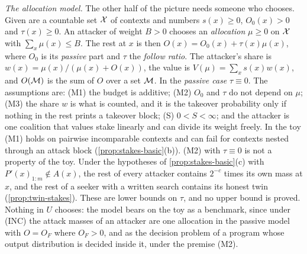 \emph{The allocation model.} The other half of the picture needs someone who chooses. Given are a countable
set $\mathcal X$ of contexts and numbers $s(x)\ge0$, $O_0(x)>0$ and $\tau(x)\ge0$. An attacker of weight $B>0$
chooses an \emph{allocation} $\mu\ge0$ on $\mathcal X$ with $\sum_x\mu(x)\le B$. The rest at $x$ is then
$O(x)=O_0(x)+\tau(x)\mu(x)$, where $O_0$ is its \emph{passive} part and $\tau$ the \emph{follow ratio}. The
attacker's share is $w(x)=\mu(x)/(\mu(x)+O(x))$, the value is $V(\mu)=\sum_xs(x)w(x)$, and $O(\mathcal M)$ is the sum
of $O$ over a set $\mathcal M$. In the \emph{passive case} $\tau\equiv0$. The assumptions are: (M1) the budget is
additive; (M2) $O_0$ and $\tau$ do not depend on $\mu$; (M3) the share $w$ is what is counted, and it is the
takeover probability only if nothing in the rest prints a takeover block; (S) $0<S<\infty$; and the attacker
is one coalition that values stake linearly and can divide its weight freely. In the toy (M1) holds on
pairwise incomparable contexts and can fail for contexts nested through an attack block
(\cref{prop:stakes-basic}(b)). (M2) with $\tau\equiv0$ is not a property of the toy. Under the hypotheses of
\cref{prop:stakes-basic}(c) with $P'(x)_{1:m}\notin A(x)$, the rest of every attacker contains $2^{-c}$ times
its own mass at $x$, and the rest of a seeker with a written search contains its honest twin
(\cref{prop:twin-stakes}). These are lower bounds on $\tau$, and no upper bound is proved. Nothing in $U$
chooses: the model bears on the toy as a benchmark, since under (INC) the attack masses of an attacker are one
allocation in the passive model with $O=O_F$ where $O_F>0$, and as the decision problem of a program whose
output distribution is decided inside it, under the premise (M2).

